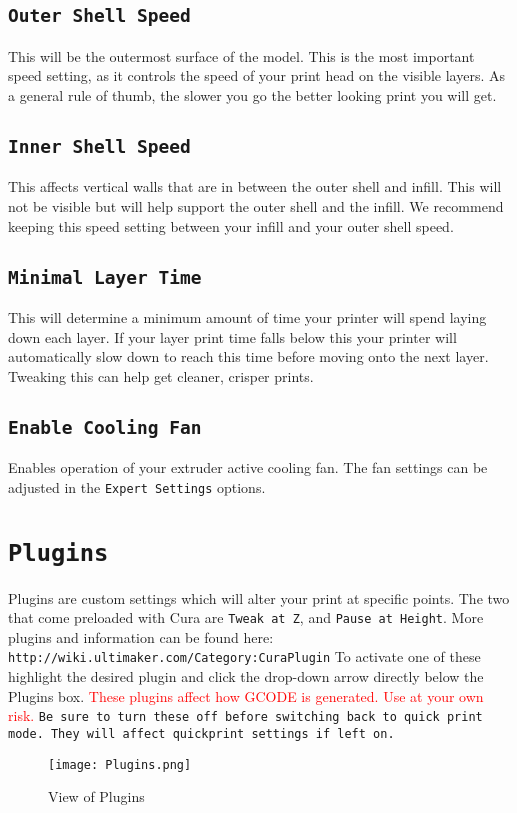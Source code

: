 \subsection{\texttt{Outer Shell Speed}}
This will be the outermost surface of the model. This is the most important speed setting, as it controls the speed of your print head on the visible layers. As a general rule of thumb, the slower you go the better looking print you will get. 

\subsection{\texttt{Inner Shell Speed}}
This affects vertical walls that are in between the outer shell and infill. This will not be visible but will help support the outer shell and the infill. We recommend keeping this speed setting between your infill and your outer shell speed.

\subsection{\texttt{Minimal Layer Time}}
This will determine a minimum amount of time your printer will spend laying down each layer. If your layer print time falls below this your printer will automatically slow down to reach this time before moving onto the next layer. Tweaking this can help get cleaner, crisper prints.

\subsection{\texttt{Enable Cooling Fan}}
Enables operation of your extruder active cooling fan. The fan settings can be adjusted in the \texttt{Expert Settings} options.

\section{\texttt{Plugins}}
Plugins are custom settings which will alter your print at specific points. The two that come preloaded with Cura are \texttt{Tweak at Z}, and \texttt{Pause at Height}. More plugins and information can be found here: \texttt{http://wiki.ultimaker.com/Category:CuraPlugin} To activate one of these highlight the desired plugin and click the drop-down arrow directly below the Plugins box. \textcolor{red}{These plugins affect how GCODE is generated. Use at your own risk.} \texttt{Be sure to turn these off before switching back to quick print mode. They will affect quickprint settings if left on.}
\begin{figure}[H]
\centering
\texttt{[image: Plugins.png]}
\caption{View of Plugins}
\label{fig:Plugins}
\end{figure}


